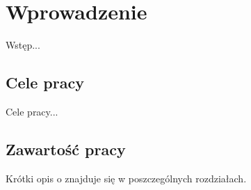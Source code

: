 \chapter{Wprowadzenie}
\label{cha:wprowadzenie}

Wstęp...

\section{Cele pracy}
\label{sec:celePracy}
Cele pracy...

\section{Zawartość pracy}
\label{sec:zawartoscPracy}

Krótki opis o znajduje się w poszczególnych rozdziałach.
